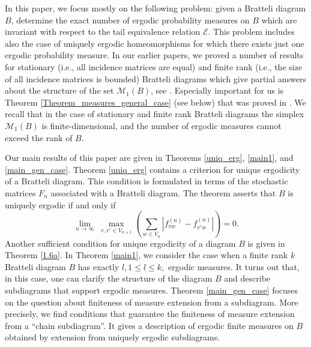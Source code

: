 \documentclass[11pt, english, reqno]{amsart}
\theoremstyle{definition}
\theoremstyle{remark}
\theoremstyle{plain}
\numberwithin{equation}{section}
\begin{document}
In this paper, we focus mostly on the following problem: given a Bratteli
diagram $B$, determine the exact number of ergodic probability measures 
on $B$ which are invariant with respect to the tail equivalence relation
 $\mathcal E$. This problem
includes also the case of uniquely ergodic homeomorphisms for which
there exists just one ergodic probability measure. In our earlier papers, we
proved a number of results for stationary (i.e., all incidence matrices are
equal) and finite rank (i.e., the size of all incidence matrices is bounded)
Bratteli diagrams which  give  partial answers about the structure of the 
set $\mathcal{M}_1(B)$, see
\cite{BezuglyiKwiatkowskiMedynetsSolomyak2010,
BezuglyiKwiatkowskiMedynetsSolomyak2013, 
AdamskaBezuglyiKarpelKwiatkowski2016}. Especially important for us 
is Theorem \ref{Theorem_measures_general_case} (see below) that was
 proved in  \cite{BezuglyiKwiatkowskiMedynetsSolomyak2010}.  
 We recall that in the case of
stationary and finite rank Bratteli diagrams the simplex $\mathcal{M}_1(B)$
is finite-dimensional, and the number of ergodic measures cannot exceed the
rank of $B$.

Our main results of this paper are given in Theorems  \ref{uniq_erg},
 \ref{main1}, and
 \ref{main_gen_case}.  Theorem  \ref{uniq_erg}  contains a  criterion for
 unique ergodicity of a
  Bratteli diagram. This condition is  formulated in terms of the stochastic
 matrices $F_n$ associated with a Bratteli diagram.  The theorem 
 asserts that $B$ is uniquely ergodic if and only if
$$
\lim_{n\to \infty}\ \max_{v, v' \in V_{n+1}} \left(\sum_{w \in V_n}
 \left|f_{vw}^{(n)} - f_{v'w}^{(n)}\right| \right) =0.
$$
Another sufficient condition for unique ergodicity of a diagram $B$
 is given in Theorem \ref{1.6a}. 
In Theorem \ref{main1}, we consider the case when a finite rank $k$ Bratteli
 diagram $B$
has exactly $l, 1\leq l \leq k,$ ergodic measures. It turns out that,
in this case,  one can clarify the structure of the diagram $B$ and describe
subdiagrams that support ergodic measures. Theorem \ref{main_gen_case}
focuses on the question about finiteness of measure extension from a
subdiagram. More precisely,
we find conditions that guarantee the finiteness of measure extension
from a ``chain subdiagram''. It gives a description  of ergodic finite
measures
on $B$ obtained by extension from  uniquely ergodic subdiagrams.
\end{document}
